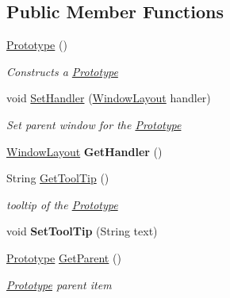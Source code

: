 \subsection*{Public Member Functions}
\begin{DoxyCompactItemize}
\item 
\mbox{\hyperlink{class_space_v_i_l_1_1_prototype_a9205e6953992749881d7de1af9dc492e}{Prototype}} ()
\begin{DoxyCompactList}\small\item\em Constructs a \mbox{\hyperlink{class_space_v_i_l_1_1_prototype}{Prototype}} \end{DoxyCompactList}\item 
void \mbox{\hyperlink{class_space_v_i_l_1_1_prototype_a3f460b82d96e624ae4f2c203774d6c60}{Set\+Handler}} (\mbox{\hyperlink{class_space_v_i_l_1_1_window_layout}{Window\+Layout}} handler)
\begin{DoxyCompactList}\small\item\em Set parent window for the \mbox{\hyperlink{class_space_v_i_l_1_1_prototype}{Prototype}} \end{DoxyCompactList}\item 
\mbox{\label{class_space_v_i_l_1_1_prototype_ab39361662b98d507caebfbbf4bc1ffab}} 
\mbox{\hyperlink{class_space_v_i_l_1_1_window_layout}{Window\+Layout}} {\bfseries Get\+Handler} ()
\item 
String \mbox{\hyperlink{class_space_v_i_l_1_1_prototype_a87c98f228c5c5f11fcf62d7534054fd6}{Get\+Tool\+Tip}} ()
\begin{DoxyCompactList}\small\item\em tooltip of the \mbox{\hyperlink{class_space_v_i_l_1_1_prototype}{Prototype}} \end{DoxyCompactList}\item 
\mbox{\label{class_space_v_i_l_1_1_prototype_a12e395a2d851006b3208548c1020fbfa}} 
void {\bfseries Set\+Tool\+Tip} (String text)
\item 
\mbox{\hyperlink{class_space_v_i_l_1_1_prototype}{Prototype}} \mbox{\hyperlink{class_space_v_i_l_1_1_prototype_a52d0e3c6f4e673553cd78fad20bded6b}{Get\+Parent}} ()
\begin{DoxyCompactList}\small\item\em \mbox{\hyperlink{class_space_v_i_l_1_1_prototype}{Prototype}} parent item \end{DoxyCompactList}\item 

\end{DoxyCompactItemize}
